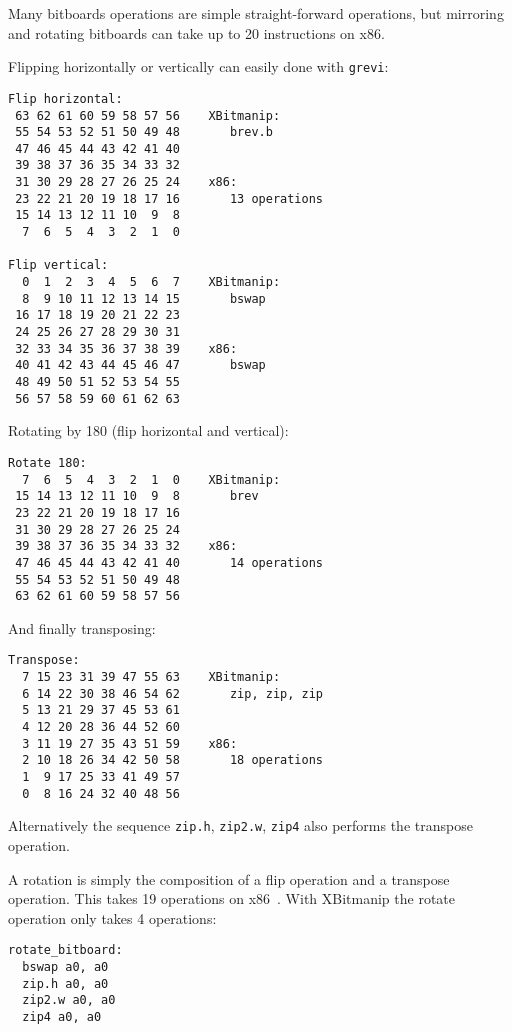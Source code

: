 Many bitboards operations are simple straight-forward operations, but mirroring
and rotating bitboards can take up to 20 instructions on x86.

Flipping horizontally or vertically can easily done with {\tt grevi}:

\begin{verbatim}
Flip horizontal:
 63 62 61 60 59 58 57 56    XBitmanip:
 55 54 53 52 51 50 49 48       brev.b
 47 46 45 44 43 42 41 40
 39 38 37 36 35 34 33 32
 31 30 29 28 27 26 25 24    x86:
 23 22 21 20 19 18 17 16       13 operations
 15 14 13 12 11 10  9  8
  7  6  5  4  3  2  1  0

Flip vertical:
  0  1  2  3  4  5  6  7    XBitmanip:
  8  9 10 11 12 13 14 15       bswap
 16 17 18 19 20 21 22 23
 24 25 26 27 28 29 30 31
 32 33 34 35 36 37 38 39    x86:
 40 41 42 43 44 45 46 47       bswap
 48 49 50 51 52 53 54 55
 56 57 58 59 60 61 62 63
\end{verbatim}

Rotating by 180 (flip horizontal and vertical):

\begin{verbatim}
Rotate 180:
  7  6  5  4  3  2  1  0    XBitmanip:
 15 14 13 12 11 10  9  8       brev
 23 22 21 20 19 18 17 16
 31 30 29 28 27 26 25 24
 39 38 37 36 35 34 33 32    x86:
 47 46 45 44 43 42 41 40       14 operations
 55 54 53 52 51 50 49 48
 63 62 61 60 59 58 57 56
\end{verbatim}

And finally transposing:

\begin{verbatim}
Transpose:
  7 15 23 31 39 47 55 63    XBitmanip:
  6 14 22 30 38 46 54 62       zip, zip, zip
  5 13 21 29 37 45 53 61
  4 12 20 28 36 44 52 60
  3 11 19 27 35 43 51 59    x86:
  2 10 18 26 34 42 50 58       18 operations
  1  9 17 25 33 41 49 57
  0  8 16 24 32 40 48 56
\end{verbatim}

Alternatively the sequence {\tt zip.h}, {\tt zip2.w}, {\tt zip4} also
performs the transpose operation.

A rotation is simply the composition of a flip operation and a transpose
operation. This takes 19 operations on x86~\cite{ChessProg}. With XBitmanip
the rotate operation only takes 4 operations:

\begin{verbatim}
rotate_bitboard:
  bswap a0, a0
  zip.h a0, a0
  zip2.w a0, a0
  zip4 a0, a0
\end{verbatim}

